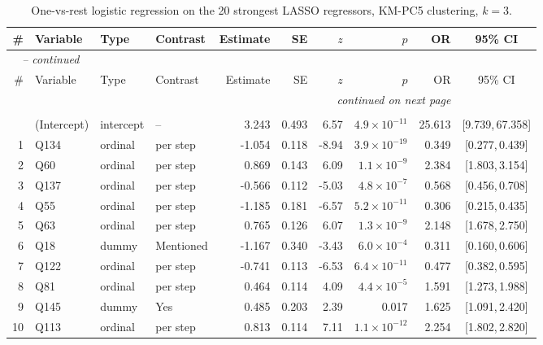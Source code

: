 \begin{landscape}
\begingroup\footnotesize
\begin{longtable}{r l l l r r r r r c}
\caption{One-vs-rest logistic regression on the 20 strongest LASSO regressors, KM-PC5 clustering, $k = 3$.}\label{tab:logit-KMPC5-k3}\\
\toprule
\# & Variable & Type & Contrast & Estimate & SE & $z$ & $p$ & OR & 95\% CI \\
\midrule
\endfirsthead
\multicolumn{9}{l}{\emph{\tablename\ \thetable{} -- continued}}\\
\toprule
\# & Variable & Type & Contrast & Estimate & SE & $z$ & $p$ & OR & 95\% CI \\
\midrule
\endhead
\midrule \multicolumn{9}{r}{\emph{continued on next page}}\\
\endfoot
\bottomrule
\endlastfoot
\multicolumn{9}{l}{\textbf{Cluster 1} \quad \small $n = 2579$ ($n_{\text{in}} = 705$), AIC $= 1299.3$, residual deviance $= 1257.3$ on 2558 df}\\[2pt]
 & (Intercept) & intercept & -- & 3.243 & 0.493 & 6.57 & $4.9{\times}10^{-11}$ & 25.613 & [9.739,\,67.358] &  \\
1 & Q134 & ordinal & per step & -1.054 & 0.118 & -8.94 & $3.9{\times}10^{-19}$ & 0.349 & [0.277,\,0.439] &  \\
2 & Q60 & ordinal & per step & 0.869 & 0.143 & 6.09 & $1.1{\times}10^{-9}$ & 2.384 & [1.803,\,3.154] &  \\
3 & Q137 & ordinal & per step & -0.566 & 0.112 & -5.03 & $4.8{\times}10^{-7}$ & 0.568 & [0.456,\,0.708] &  \\
4 & Q55 & ordinal & per step & -1.185 & 0.181 & -6.57 & $5.2{\times}10^{-11}$ & 0.306 & [0.215,\,0.435] &  \\
5 & Q63 & ordinal & per step & 0.765 & 0.126 & 6.07 & $1.3{\times}10^{-9}$ & 2.148 & [1.678,\,2.750] &  \\
6 & Q18 & dummy & Mentioned & -1.167 & 0.340 & -3.43 & $6.0{\times}10^{-4}$ & 0.311 & [0.160,\,0.606] &  \\
7 & Q122 & ordinal & per step & -0.741 & 0.113 & -6.53 & $6.4{\times}10^{-11}$ & 0.477 & [0.382,\,0.595] &  \\
8 & Q81 & ordinal & per step & 0.464 & 0.114 & 4.09 & $4.4{\times}10^{-5}$ & 1.591 & [1.273,\,1.988] &  \\
9 & Q145 & dummy & Yes & 0.485 & 0.203 & 2.39 & 0.017 & 1.625 & [1.091,\,2.420] &  \\
10 & Q113 & ordinal & per step & 0.813 & 0.114 & 7.11 & $1.1{\times}10^{-12}$ & 2.254 & [1.802,\,2.820] &  \\

\end{longtable}
\end{landscape}
